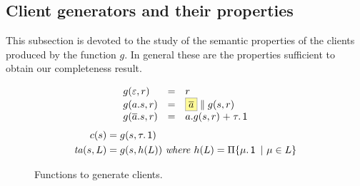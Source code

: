 

\subsection{Client generators and their properties}
\label{sec:client-generators}

This subsection is devoted to the study of the semantic properties
of the clients produced by the function $g$.
In general these are the properties sufficient to obtain our
completeness result.


\begin{figure}[t]
  \hrulefill
  $$
  \begin{array}{lll}
    g(\varepsilon, \client) & = & \client  \\
    g(\aa.\trace, \client) & = &  \mailbox{\co{\aa}} \Par g( \trace , \client)  \\
    g(\co{\aa}.\trace, \client) & = & \aa . g(\trace , \client) \extc \tau.\Unit
  \end{array}
  $$
  \begin{align}
    c( s ) & = g( s ,\tau.\mathop{\textsf{1}}) \label{def:cs} \\
    \mathit{ta}( s ,L) & = g(s ,h(L)) \ \mathit{where} \ h(L) = \Pi\{  \mu.\mathop{\textsf{1}}  \ |\ \mu \in L  \}  \label{def:tsL}
  \end{align}
  \caption{Functions to generate clients.}
  \label{fig:test-generators}
  \label{fig:client-generators}
  \hrulefill
\end{figure}




